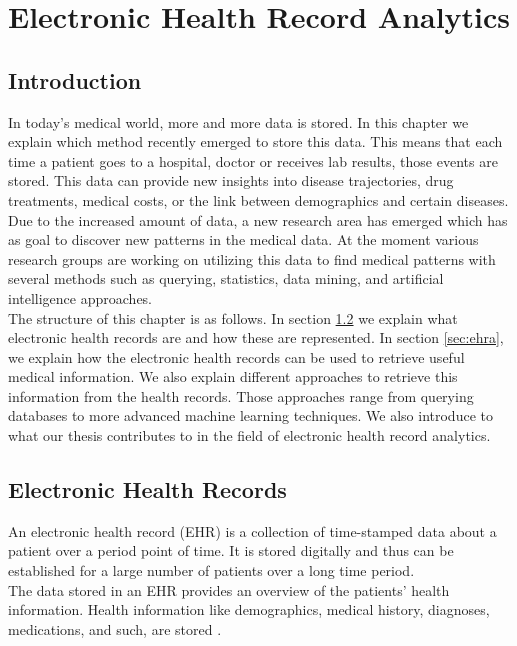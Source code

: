 \graphicspath{ {Context/Images/} }


\chapter{Electronic Health Record Analytics}
\label{cha:context}

\section{Introduction}

In today's medical world, more and more data is stored. In this chapter we explain which method recently emerged to store this data. This means that each time a patient goes to a hospital, doctor or receives lab results, those events are stored. This data can provide new insights into disease trajectories, drug treatments, medical costs, or the link between demographics and certain diseases. \\

Due to the increased amount of data, a new research area has emerged which has as goal to discover new patterns in the medical data. At the moment various research groups are working on utilizing this data to find medical patterns with several methods such as querying, statistics, data mining, and artificial intelligence approaches. \\

The structure of this chapter is as follows. In section \ref{sec:ehr} we explain what electronic health records are and how these are represented. In section \ref{sec:ehra}, we explain how the electronic health records can be used to retrieve useful medical information. We also explain different approaches to retrieve this information from the health records. Those approaches range from querying databases to more advanced machine learning techniques. We also introduce to what our thesis contributes to in the field of electronic health record analytics.


\section{Electronic Health Records}
\label{sec:ehr}

An electronic health record (EHR) is a collection of time-stamped data about a patient over a period point of time. It is stored digitally and thus can be established for a large number of patients over a long time period. \\
The data stored in an EHR provides an overview of the patients' health information. Health information like demographics, medical history, diagnoses, medications, and such, are stored \cite{HealthIT:online}. \\

